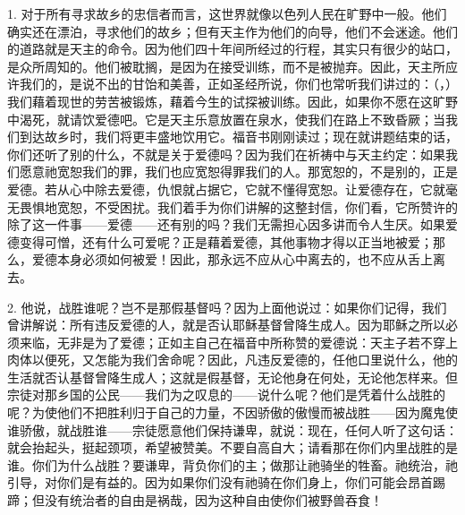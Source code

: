 1. 对于所有寻求故乡的忠信者而言，这世界就像以色列人民在旷野中一般。他们确实还在漂泊，寻求他们的故乡；但有天主作为他们的向导，他们不会迷途。他们的道路就是天主的命令。因为他们四十年间所经过的行程，其实只有很少的站口，是众所周知的。他们被耽搁，是因为在接受训练，而不是被抛弃。因此，天主所应许我们的，是说不出的甘饴和美善，正如圣经所说，你们也常听我们讲过的：（，）我们藉着现世的劳苦被锻炼，藉着今生的试探被训练。因此，如果你不愿在这旷野中渴死，就请饮爱德吧。它是天主乐意放置在泉水，使我们在路上不致昏厥；当我们到达故乡时，我们将更丰盛地饮用它。福音书刚刚读过；现在就讲题结束的话，你们还听了别的什么，不就是关于爱德吗？因为我们在祈祷中与天主约定：如果我们愿意祂宽恕我们的罪，我们也应宽恕得罪我们的人。那宽恕的，不是别的，正是爱德。若从心中除去爱德，仇恨就占据它，它就不懂得宽恕。让爱德存在，它就毫无畏惧地宽恕，不受困扰。我们着手为你们讲解的这整封信，你们看，它所赞许的除了这一件事——爱德——还有别的吗？我们无需担心因多讲而令人生厌。如果爱德变得可憎，还有什么可爱呢？正是藉着爱德，其他事物才得以正当地被爱；那么，爱德本身必须如何被爱！因此，那永远不应从心中离去的，也不应从舌上离去。\par

2. 他说，战胜谁呢？岂不是那假基督吗？因为上面他说过：如果你们记得，我们曾讲解说：所有违反爱德的人，就是否认耶稣基督曾降生成人。因为耶稣之所以必须来临，无非是为了爱德；正如主自己在福音中所称赞的爱德说：天主子若不穿上肉体以便死，又怎能为我们舍命呢？因此，凡违反爱德的，任他口里说什么，他的生活就否认基督曾降生成人；这就是假基督，无论他身在何处，无论他怎样来。但宗徒对那乡国的公民——我们为之叹息的——说什么呢？他们是凭着什么战胜的呢？为使他们不把胜利归于自己的力量，不因骄傲的傲慢而被战胜——因为魔鬼使谁骄傲，就战胜谁——宗徒愿意他们保持谦卑，就说：现在，任何人听了这句话：就会抬起头，挺起颈项，希望被赞美。不要自高自大；请看那在你们内里战胜的是谁。你们为什么战胜？要谦卑，背负你们的主；做那让祂骑坐的牲畜。祂统治，祂引导，对你们是有益的。因为如果你们没有祂骑在你们身上，你们可能会昂首踢蹄；但没有统治者的自由是祸哉，因为这种自由使你们被野兽吞食！\par

